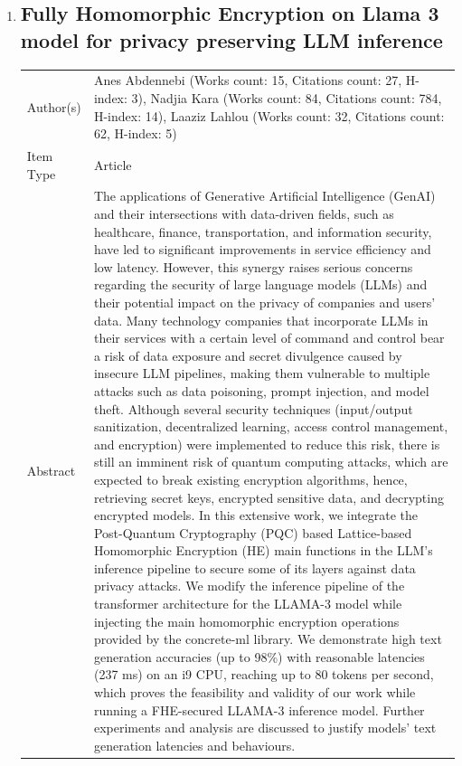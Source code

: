 \documentclass{article}
\begin{document}
\begin{enumerate}[label=\arabic*., font=\Large]
\item
{}\label{fully-homomorphic-encryption-on-llama-3-model-for-privacy-preserving-llm-inference}
\hypertarget{item_ABDENNEBIFullyHomomorphicEncryptionLlama3Model2026}{}
\subsection*{Fully Homomorphic Encryption on Llama 3 model for privacy preserving LLM inference}

\begin{longtable}{p{} p{\contentcolwidth-2\tabcolsep}}
\toprule
Author(s) & Anes Abdennebi (Works count: 15, Citations count: 27, H-index: 3), Nadjia Kara (Works count: 84, Citations count: 784, H-index: 14), Laaziz Lahlou (Works count: 32, Citations count: 62, H-index: 5) \\
Item Type & Article \\
Abstract & The applications of Generative Artificial Intelligence (GenAI) and their intersections with data-driven fields, such as healthcare, finance, transportation, and information security, have led to significant improvements in service efficiency and low latency. However, this synergy raises serious concerns regarding the security of large language models (LLMs) and their potential impact on the privacy of companies and users' data. Many technology companies that incorporate LLMs in their services with a certain level of command and control bear a risk of data exposure and secret divulgence caused by insecure LLM pipelines, making them vulnerable to multiple attacks such as data poisoning, prompt injection, and model theft. Although several security techniques (input/output sanitization, decentralized learning, access control management, and encryption) were implemented to reduce this risk, there is still an imminent risk of quantum computing attacks, which are expected to break existing encryption algorithms, hence, retrieving secret keys, encrypted sensitive data, and decrypting encrypted models. In this extensive work, we integrate the Post-Quantum Cryptography (PQC) based Lattice-based Homomorphic Encryption (HE) main functions in the LLM's inference pipeline to secure some of its layers against data privacy attacks. We modify the inference pipeline of the transformer architecture for the LLAMA-3 model while injecting the main homomorphic encryption operations provided by the concrete-ml library. We demonstrate high text generation accuracies (up to 98\%) with reasonable latencies (237 ms) on an i9 CPU, reaching up to 80 tokens per second, which proves the feasibility and validity of our work while running a FHE-secured LLAMA-3 inference model. Further experiments and analysis are discussed to justify models' text generation latencies and behaviours. \\

\end{longtable}
\end{enumerate}
\end{document}
